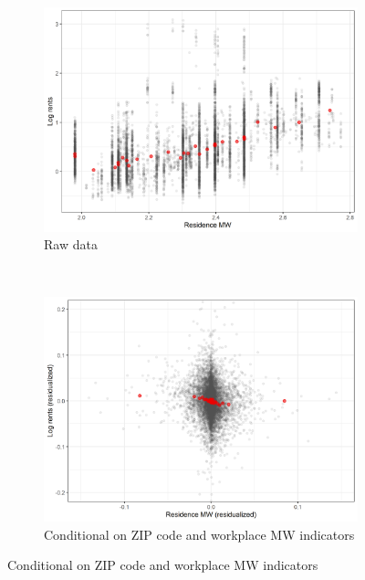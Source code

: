\documentclass{article}
\begin{document}
\clearpage
\begin{figure}[h!]
    \centering
    \caption{The relationship between log rents and the residence MW}
    \label{fig:ln_rents_mw_res}

    \begin{subfigure}{.7\textwidth}
        \caption{Raw data}
        \includegraphics[width = 1\textwidth]
            {plots/cbsa_month_mw_res.png}
    \end{subfigure}\\
    \begin{subfigure}{.7\textwidth}
        \caption{Conditional on ZIP code and workplace MW indicators}
        \includegraphics[width = 1\textwidth]
            {plots/cbsa_month_mw_res_resid_mw_wkp_dec.png}
    \end{subfigure}


\end{figure}
\end{document}
